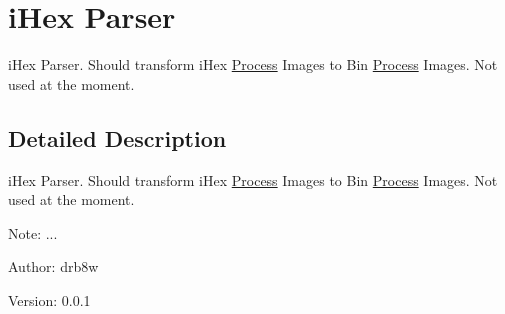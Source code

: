 \hypertarget{group___v_m_m___h_e_x}{
\section{iHex Parser}
\label{group___v_m_m___h_e_x}
}
iHex Parser. Should transform iHex \hyperlink{struct_process}{Process} Images to Bin \hyperlink{struct_process}{Process} Images. Not used at the moment.  




\subsection{Detailed Description}
iHex Parser. Should transform iHex \hyperlink{struct_process}{Process} Images to Bin \hyperlink{struct_process}{Process} Images. Not used at the moment. 

\begin{Desc}
\item[Note:]... \end{Desc}
\begin{Desc}
\item[Author:]drb8w \end{Desc}
\begin{Desc}
\item[Version:]0.0.1 \end{Desc}
